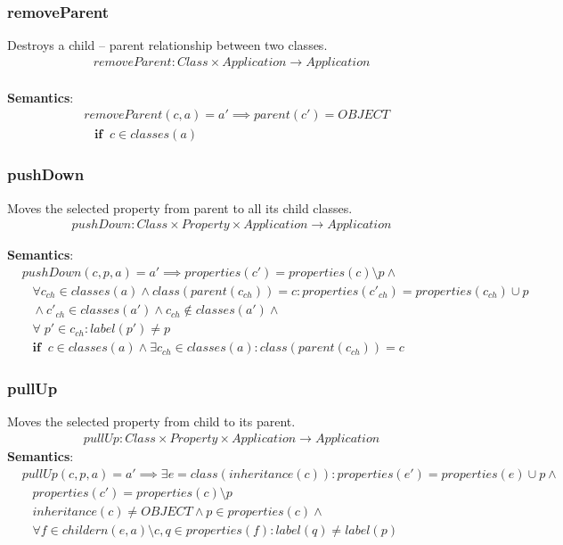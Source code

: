 \documentclass[10pt]{article}
\begin{document}
\subsubsection{removeParent}
Destroys a child -- parent relationship between two classes.
\begin{align}
removeParent: Class \times Application \rightarrow Application \\
\end{align}

\noindent \textbf{Semantics}:
\begin{align}
& removeParent(c, a) = a' \implies parent(c') = OBJECT \nonumber \\
& \;\;\; \mathbf{if} \;\; c \in classes(a)
\end{align}

\subsubsection{pushDown}
Moves the selected property from parent to all its child classes. 
\begin{align}
pushDown: Class \times Property \times Application \rightarrow Application
\end{align}

\noindent \textbf{Semantics}:
\begin{align}
& pushDown(c, p, a) = a' \implies properties(c') = properties(c) \setminus p \land \nonumber \\ 
& \;\;\; \forall c_{ch} \in classes(a) \land class(parent(c_{ch})) = c : properties(c'_{ch}) = properties(c_{ch}) \cup p \nonumber \\
& \;\;\;\land c'_{ch} \in classes(a') \land c_{ch} \notin classes(a') \land \nonumber \\
& \;\;\; \forall \; p' \in c_{ch} : label(p') \neq p \nonumber \\
& \;\;\; \mathbf{if}  \;\; c \in classes(a) \land \exists c_{ch} \in classes(a) : class(parent(c_{ch})) = c
\end{align}


\subsubsection{pullUp}
Moves the selected property from child to its parent.
\begin{align}
pullUp: Class \times Property \times Application \rightarrow Application
\end{align}
\noindent \textbf{Semantics}:
\begin{align}
& pullUp(c, p, a) = a' \implies \exists e = class(inheritance(c)) : properties(e') = properties(e) \cup p \land \nonumber \\
& \;\;\;  properties(c') = properties(c) \setminus p \nonumber \\
& \;\;\; inheritance(c) \neq OBJECT \land p \in properties(c) \land \nonumber \\
& \;\;\; \forall f \in childern(e,a) \setminus c, q \in properties(f) : label(q) \neq label(p) 
\end{align}
\end{document}
